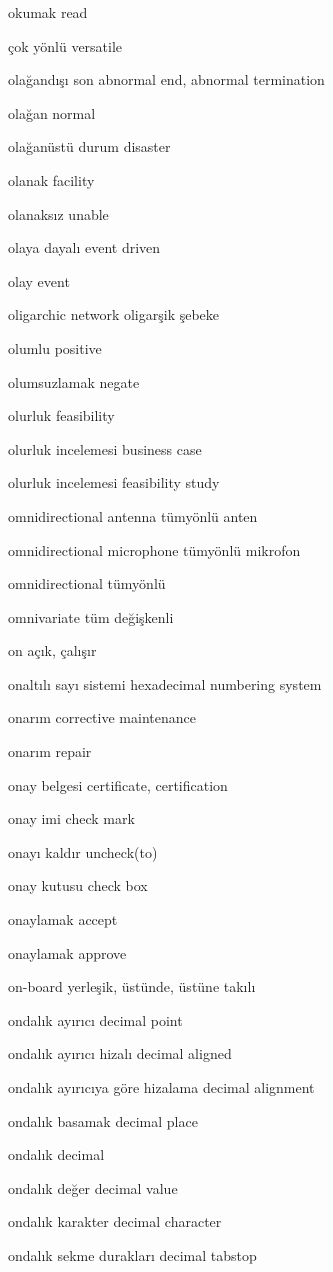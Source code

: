 \documentclass[12pt,fleqn]{article}\usepackage{../../common}
\begin{document}
okumak read

çok yönlü versatile

olağandışı son abnormal end, abnormal termination

olağan normal

olağanüstü durum disaster

olanak facility

olanaksız unable

olaya dayalı event driven

olay event

oligarchic network oligarşik şebeke

olumlu positive

olumsuzlamak negate

olurluk feasibility

olurluk incelemesi business case

olurluk incelemesi feasibility study

omnidirectional antenna tümyönlü anten

omnidirectional microphone tümyönlü mikrofon

omnidirectional tümyönlü

omnivariate tüm değişkenli

on açık, çalışır

onaltılı sayı sistemi hexadecimal numbering system

onarım corrective maintenance

onarım repair

onay belgesi certificate, certification

onay imi check mark

onayı kaldır uncheck(to)

onay kutusu check box

onaylamak accept

onaylamak approve

on-board yerleşik, üstünde, üstüne takılı

ondalık ayırıcı decimal point

ondalık ayırıcı hizalı decimal aligned

ondalık ayırıcıya göre hizalama decimal alignment

ondalık basamak decimal place

ondalık decimal

ondalık değer decimal value

ondalık karakter decimal character

ondalık sekme durakları decimal tabstop
\end{document}
